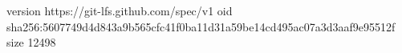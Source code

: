 version https://git-lfs.github.com/spec/v1
oid sha256:5607749d4d843a9b565cfc41f0ba11d31a59be14cd495ac07a3d3aaf9e95512f
size 12498
